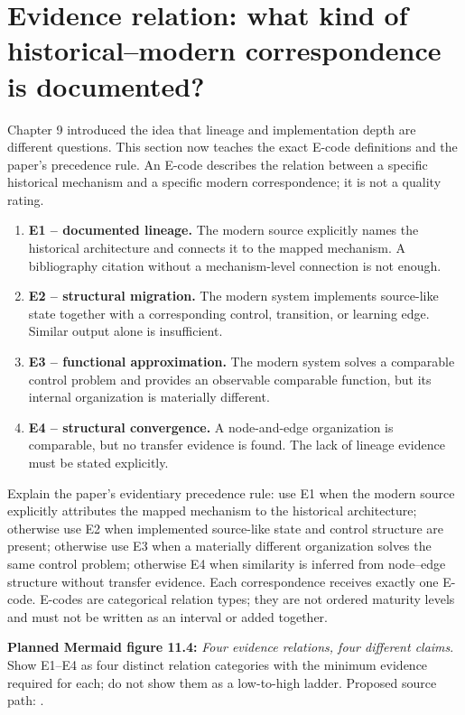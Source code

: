 \section{Evidence relation: what kind of historical--modern correspondence is documented?}
Chapter 9 introduced the idea that lineage and implementation depth are different questions. This section now teaches the exact E-code definitions and the paper's precedence rule. An E-code describes the relation between a specific historical mechanism and a specific modern correspondence; it is not a quality rating.
\begin{enumerate}
  \item \textbf{E1 -- documented lineage.} The modern source explicitly names the historical architecture and connects it to the mapped mechanism. A bibliography citation without a mechanism-level connection is not enough.
  \item \textbf{E2 -- structural migration.} The modern system implements source-like state together with a corresponding control, transition, or learning edge. Similar output alone is insufficient.
  \item \textbf{E3 -- functional approximation.} The modern system solves a comparable control problem and provides an observable comparable function, but its internal organization is materially different.
  \item \textbf{E4 -- structural convergence.} A node-and-edge organization is comparable, but no transfer evidence is found. The lack of lineage evidence must be stated explicitly.
\end{enumerate}

Explain the paper's evidentiary precedence rule: use E1 when the modern source explicitly attributes the mapped mechanism to the historical architecture; otherwise use E2 when implemented source-like state and control structure are present; otherwise use E3 when a materially different organization solves the same control problem; otherwise E4 when similarity is inferred from node--edge structure without transfer evidence. Each correspondence receives exactly one E-code. E-codes are categorical relation types; they are not ordered maturity levels and must not be written as an interval or added together.

\textbf{Planned Mermaid figure 11.4:} \emph{Four evidence relations, four different claims}. Show E1--E4 as four distinct relation categories with the minimum evidence required for each; do not show them as a low-to-high ladder. Proposed source path: .

